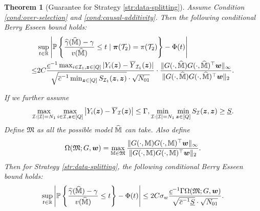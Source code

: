 \documentclass[12pt]{article}
\newtheorem{theorem}{Theorem}
\begin{document}
\begin{theorem}[Guarantee for Strategy \ref{str:data-splitting}]\label{thm:strategy-III}
Assume Condition \ref{cond:over-selection} and \ref{cond:causal-additivity}. Then the following conditional Berry Esseen bound holds:
\begin{align}
&\sup_{t\in{\mathbb{R}}}\left|{{\mathbb{P}}\left\{\frac{{\widehat{\gamma}}(\widehat{{\mathbb{M}}}) - \gamma}{v(\widehat{{\mathbb{M}}})} \le t  \mid  \boldsymbol{\pi}({\mathcal{T}}_2) = \pi({\mathcal{T}}_2)\right\}} - \Phi(t)\right|\notag\\ 
\le &
2C  \frac{\underline{c}^{-1} \max_{i\in{\mathcal{I}}_1,{\boldsymbol{z}}\in[Q]}|Y_i({\boldsymbol{z}})-\overline{Y}_{{\mathcal{I}}_1}({\boldsymbol{z}})|}{\sqrt{\overline{c}^{-1} \min_{{\boldsymbol{z}}\in[Q]} S_{{\mathcal{I}}_1}({\boldsymbol{z}},{\boldsymbol{z}})}\cdot \sqrt{N_{01}}}\cdot \frac{\|G(\cdot, \widehat{{\mathbb{M}}})G(\cdot, \widehat{{\mathbb{M}}})^\top {\boldsymbol{w}}\|_\infty}{\|G(\cdot, \widehat{{\mathbb{M}}})G(\cdot, \widehat{{\mathbb{M}}})^\top {\boldsymbol{w}}\|_2}.
\end{align}

 If we further assume
\begin{gather}\label{eqn:uniform-cond}
    \max_{{\mathcal{I}}:|{\mathcal{I}}| = N_1}\max_{i\in{\mathcal{I}}, {\boldsymbol{z}}\in [Q]} \left|Y_i({\boldsymbol{z}}) - \overline{Y}_{{\mathcal{I}}}({\boldsymbol{z}}) \right| \le \Gamma, 
    \min_{{\mathcal{I}}:|{\mathcal{I}}| = N_{1}}\min_{{\boldsymbol{z}}\in [Q]} S_{{\mathcal{I}}}({\boldsymbol{z}},{\boldsymbol{z}}) \ge \underline{S}.
\end{gather}
Define $\mathfrak{M}$ as all the possible model $\widehat{{\mathbb{M}}}$ can take.  Also define
\begin{align}\label{eqn:Omega}
    \Omega(\mathfrak{M};G,{\boldsymbol{w}}) = \max_{{\mathbb{M}}\in\mathfrak{M}} \frac{\| G(\cdot, {\mathbb{M}})G(\cdot, {\mathbb{M}})^\top {\boldsymbol{w}}\|_\infty}{\| G(\cdot, {\mathbb{M}})G(\cdot, {\mathbb{M}})^\top {\boldsymbol{w}}\|_2}.
\end{align}
Then for Strategy \ref{str:data-splitting}, the following conditional Berry Esseen bound holds:
\begin{align*}
    \sup_{t\in{\mathbb{R}}}\left|{{\mathbb{P}}\left\{\frac{{\widehat{\gamma}}(\widehat{{\mathbb{M}}}) - \gamma}{v(\widehat{{\mathbb{M}}})} \le t\right\}} - \Phi(t)\right| \le 2C\sigma_w   \frac{\underline{c}^{-1} \Gamma\Omega(\mathfrak{M};G,{\boldsymbol{w}})}{\sqrt{\overline{c}^{-1} \underline{S}}\cdot \sqrt{N_{01}}}.
\end{align*}
\end{theorem}
\end{document}
